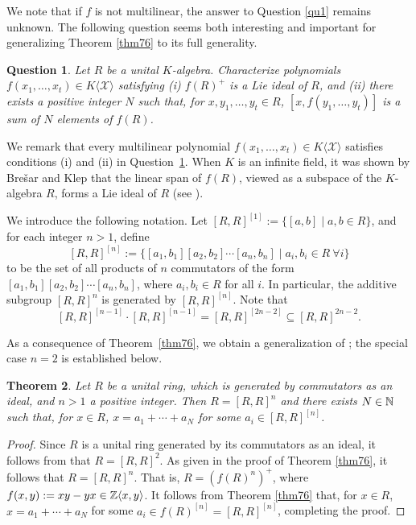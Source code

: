 \documentclass[11pt]{article}
\newtheorem{theorem}{Theorem}
\newtheorem{question}[theorem]{Question}
\theoremstyle{definition}
\begin{document}
{{{{				We note that if $f$ is not multilinear, the answer to Question \ref{qu1} remains unknown. The following question seems both interesting and important for generalizing Theorem \ref{thm76} to its full generality.
				
				\begin{question}\label{qu2}
					Let $R$ be a unital $K$-algebra. Characterize polynomials $f (x_1,\ldots,x_t)\in K\langle \mathcal{X} \rangle$ satisfying
					(i) $f(R)^+$ is a Lie ideal of $R$, and (ii) there exists a positive integer $N$ such that, for $x, y_1,\ldots,y_t\in R$,
					$[x, f(y_1,\ldots,y_t)] $ is a sum of $N$ elements of $f(R)$.
				\end{question}
				
				
				We remark that every multilinear polynomial $f(x_1,\ldots,x_t) \in K\langle \mathcal{X} \rangle$ satisfies conditions (i) and (ii) in Question~\ref{qu2}. When $K$ is an infinite field, it was shown by Bre\v{s}ar and Klep that the linear span of $f(R)$, viewed as a subspace of the $K$-algebra $R$, forms a Lie ideal of $R$ (see \cite[Theorem 2.3]{bresar2009}).
				
				We introduce the following notation. Let $[R,R]^{[1]} := \{[a,b] \mid a,b \in R\}$, and for each integer $n > 1$, define $$
				[R, R]^{[n]}:=\{[a_1, b_1][a_2, b_2]\cdots[a_n, b_n]\mid a_i, b_i\in R\ \forall i\}
				$$ to be the set of all products of $n$ commutators of the form $[a_1,b_1][a_2,b_2]\cdots[a_n,b_n]$, where $a_i,b_i \in R$ for all $i$. In particular, the additive subgroup $[R,R]^n$ is generated by $[R,R]^{[n]}$. Note that
				\[
				[R,R]^{[n-1]} \cdot [R,R]^{[n-1]} = [R,R]^{[2n-2]} \subseteq [R,R]^{2n-2}.
				\]
				
				As a consequence of Theorem~\ref{thm76}, we obtain a generalization of \cite[Theorem A]{Pa_Ga_25}; the special case $n=2$ is established below.
				
				\begin{theorem}\label{thm77}
					Let $R$ be a unital ring, which is generated by commutators as an ideal, and $n>1$  a positive integer. Then $R=[R, R]^n$ and there exists $N\in \Bbb N$ such that, for $x\in R$,
					$x=a_1+\cdots+a_N$ for some $a_i\in [R, R]^{[n]}$.
				\end{theorem}
				
				\begin{proof}
					Since $R$ is a unital ring generated by its commutators as an ideal, it follows from \cite[Theorem 3.10]{calugareanu2026} that $R=[R, R]^2$.
					As given in the proof of Theorem \ref{thm76}, it follows that $R=[R, R]^n$. That is, $R=(f(R)^n)^+$, where $f(x, y):=xy-yx\in \Bbb Z\langle x, y\rangle$.
					It follows from  Theorem \ref{thm76} that, for $x\in R$,
					$x=a_1+\cdots+a_N$ for some $a_i\in f(R)^{[n]}=[R, R]^{[n]}$, completing the proof.
				\end{proof}
				
}}}}
\end{document}
